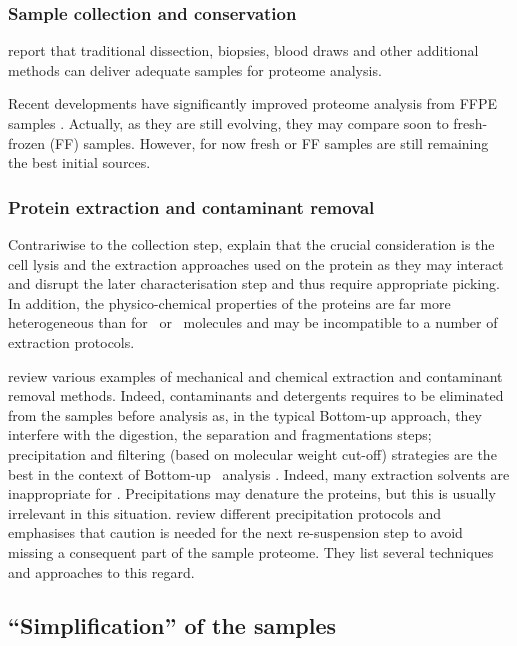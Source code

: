 \subsubsection{Sample collection and conservation}
\cite{Feist2015} report that traditional dissection, biopsies, blood draws and
other additional methods can deliver adequate samples for proteome analysis.

Recent developments have significantly improved proteome analysis from
\gls{FFPE} samples . Actually, as they are still evolving,
they may compare soon to fresh-frozen (\gls{FF}) samples.
However, for now fresh or \gls{FF} samples are still remaining the best initial
sources.

\subsubsection{Protein extraction and contaminant removal}
Contrariwise to the collection step, \cite{Feist2015} explain that the crucial
consideration is the cell lysis and the extraction approaches used on
the protein as they may interact and disrupt the later characterisation step and
thus require appropriate picking. In addition, the physico-chemical properties of
the proteins are far more heterogeneous than for \DNA\ or \RNA\ molecules
 and may be incompatible to a number of extraction protocols.

\cite{Gutstein2008,Bodzon-Kulakowska2007,Visser2005,Hilbrig2003} review various
examples of mechanical and chemical extraction and contaminant removal methods.
Indeed, contaminants and detergents requires to be eliminated from the samples
before analysis as, in the typical \gls{Bottom-up} approach, they interfere
with the digestion, the separation and fragmentations steps; precipitation and
filtering (based on molecular weight cut-off) strategies are the best in the
context of \gls{Bottom-up} \ms\ analysis . Indeed, many
extraction solvents are inappropriate for \ms. Precipitations may denature the
proteins, but this is usually irrelevant in this situation. \cite{Feist2015}
review different precipitation protocols and emphasises that caution is needed
for the next re-suspension step to avoid missing a consequent part of the
sample proteome. They list several techniques and approaches to this regard.

\subsection{\enquote{Simplification} of the samples}

